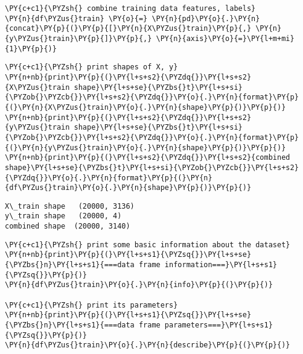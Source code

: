     \begin{tcolorbox}[breakable, size=fbox, boxrule=1pt, pad at break*=1mm,colback=cellbackground, colframe=cellborder]
\begin{Verbatim}[commandchars=\\\{\}]
\PY{c+c1}{\PYZsh{} combine training data features, labels}
\PY{n}{df\PYZus{}train} \PY{o}{=} \PY{n}{pd}\PY{o}{.}\PY{n}{concat}\PY{p}{(}\PY{p}{[}\PY{n}{X\PYZus{}train}\PY{p}{,} \PY{n}{y\PYZus{}train}\PY{p}{]}\PY{p}{,} \PY{n}{axis}\PY{o}{=}\PY{l+m+mi}{1}\PY{p}{)}
\end{Verbatim}
\end{tcolorbox}

    \begin{tcolorbox}[breakable, size=fbox, boxrule=1pt, pad at break*=1mm,colback=cellbackground, colframe=cellborder]
\begin{Verbatim}[commandchars=\\\{\}]
\PY{c+c1}{\PYZsh{} print shapes of X, y}
\PY{n+nb}{print}\PY{p}{(}\PY{l+s+s2}{\PYZdq{}}\PY{l+s+s2}{X\PYZus{}train shape}\PY{l+s+se}{\PYZbs{}t}\PY{l+s+si}{\PYZob{}\PYZcb{}}\PY{l+s+s2}{\PYZdq{}}\PY{o}{.}\PY{n}{format}\PY{p}{(}\PY{n}{X\PYZus{}train}\PY{o}{.}\PY{n}{shape}\PY{p}{)}\PY{p}{)}
\PY{n+nb}{print}\PY{p}{(}\PY{l+s+s2}{\PYZdq{}}\PY{l+s+s2}{y\PYZus{}train shape}\PY{l+s+se}{\PYZbs{}t}\PY{l+s+si}{\PYZob{}\PYZcb{}}\PY{l+s+s2}{\PYZdq{}}\PY{o}{.}\PY{n}{format}\PY{p}{(}\PY{n}{y\PYZus{}train}\PY{o}{.}\PY{n}{shape}\PY{p}{)}\PY{p}{)}
\PY{n+nb}{print}\PY{p}{(}\PY{l+s+s2}{\PYZdq{}}\PY{l+s+s2}{combined shape}\PY{l+s+se}{\PYZbs{}t}\PY{l+s+si}{\PYZob{}\PYZcb{}}\PY{l+s+s2}{\PYZdq{}}\PY{o}{.}\PY{n}{format}\PY{p}{(}\PY{n}{df\PYZus{}train}\PY{o}{.}\PY{n}{shape}\PY{p}{)}\PY{p}{)}
\end{Verbatim}
\end{tcolorbox}

    \begin{Verbatim}[commandchars=\\\{\}]
X\_train shape   (20000, 3136)
y\_train shape   (20000, 4)
combined shape  (20000, 3140)
    \end{Verbatim}

    \begin{tcolorbox}[breakable, size=fbox, boxrule=1pt, pad at break*=1mm,colback=cellbackground, colframe=cellborder]
\begin{Verbatim}[commandchars=\\\{\}]
\PY{c+c1}{\PYZsh{} print some basic information about the dataset}
\PY{n+nb}{print}\PY{p}{(}\PY{l+s+s1}{\PYZsq{}}\PY{l+s+se}{\PYZbs{}n}\PY{l+s+s1}{===data frame information===}\PY{l+s+s1}{\PYZsq{}}\PY{p}{)}
\PY{n}{df\PYZus{}train}\PY{o}{.}\PY{n}{info}\PY{p}{(}\PY{p}{)}

\PY{c+c1}{\PYZsh{} print its parameters}
\PY{n+nb}{print}\PY{p}{(}\PY{l+s+s1}{\PYZsq{}}\PY{l+s+se}{\PYZbs{}n}\PY{l+s+s1}{===data frame parameters===}\PY{l+s+s1}{\PYZsq{}}\PY{p}{)}
\PY{n}{df\PYZus{}train}\PY{o}{.}\PY{n}{describe}\PY{p}{(}\PY{p}{)}
\end{Verbatim}
\end{tcolorbox}

